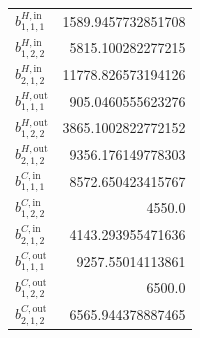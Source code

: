 \documentclass{article}%
\begin{document}
\begin{multicols*}{3}
\begin{supertabular}{lr}
	$b_{1,1,1}^{H,\text{in}}$ & 1589.9457732851708 \\%
	$b_{1,2,2}^{H,\text{in}}$ & 5815.100282277215 \\%
	$b_{2,1,2}^{H,\text{in}}$ & 11778.826573194126 \\%
	$b_{1,1,1}^{H,\text{out}}$ & 905.0460555623276 \\%
	$b_{1,2,2}^{H,\text{out}}$ & 3865.1002822772152 \\%
	$b_{2,1,2}^{H,\text{out}}$ & 9356.176149778303 \\%
	$b_{1,1,1}^{C,\text{in}}$ & 8572.650423415767 \\%
	$b_{1,2,2}^{C,\text{in}}$ & 4550.0 \\%
	$b_{2,1,2}^{C,\text{in}}$ & 4143.293955471636 \\%
	$b_{1,1,1}^{C,\text{out}}$ & 9257.55014113861 \\%
	$b_{1,2,2}^{C,\text{out}}$ & 6500.0 \\%
	$b_{2,1,2}^{C,\text{out}}$ & 6565.944378887465 \\%
\end{supertabular}%
\end{multicols*}%
\clearpage%
\end{document}
